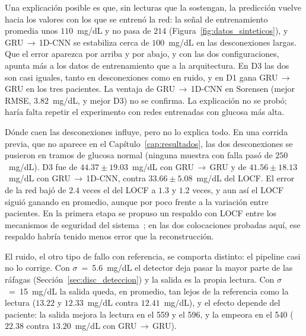 \documentclass{report}
\begin{document}
Una explicación posible es que, sin lecturas que la sostengan, la predicción vuelve hacia los valores con los que se entrenó la red: la señal de entrenamiento promedia unos $110$~mg/dL y no pasa de $214$ (Figura~\ref{fig:datos_sinteticos}), y GRU\,$\rightarrow$\,1D-CNN se estabiliza cerca de $100$~mg/dL en las desconexiones largas. Que el error aparezca por arriba y por abajo, y con las dos configuraciones, apunta más a los datos de entrenamiento que a la arquitectura. En D3 las dos son casi iguales, tanto en desconexiones como en ruido, y en D1 gana GRU\,$\rightarrow$\,GRU en los tres pacientes. La ventaja de GRU\,$\rightarrow$\,1D-CNN en Sorensen (mejor RMSE, $3.82$~mg/dL, y mejor D3) no se confirma. La explicación no se probó; haría falta repetir el experimento con redes entrenadas con glucosa más alta.

Dónde caen las desconexiones influye, pero no lo explica todo. En una corrida previa, que no aparece en el Capítulo~\ref{cap:resultados}, las dos desconexiones se pusieron en tramos de glucosa normal (ninguna muestra con falla pasó de $250$~mg/dL). D3 fue de $44.37 \pm 19.03$~mg/dL con GRU\,$\rightarrow$\,GRU y de $41.56 \pm 18.13$~mg/dL con GRU\,$\rightarrow$\,1D-CNN, contra $33.66 \pm 5.08$~mg/dL del LOCF. El error de la red bajó de $2.4$ veces el del LOCF a $1.3$ y $1.2$ veces, y aun así el LOCF siguió ganando en promedio, aunque por poco frente a la variación entre pacientes. En la primera etapa se propuso un respaldo con LOCF entre los mecanismos de seguridad del sistema~\cite{sanchez2025imputation}; en las dos colocaciones probadas aquí, ese respaldo habría tenido menos error que la reconstrucción.

El ruido, el otro tipo de fallo con referencia, se comporta distinto: el pipeline casi no lo corrige. Con $\sigma$~=~5.6~mg/dL el detector deja pasar la mayor parte de las ráfagas (Sección~\ref{sec:disc_deteccion}) y la salida es la propia lectura. Con $\sigma$~=~15~mg/dL la salida queda, en promedio, tan lejos de la referencia como la lectura ($13.22$ y $12.33$~mg/dL contra $12.41$~mg/dL), y el efecto depende del paciente: la salida mejora la lectura en el 559 y el 596, y la empeora en el 540 ($22.38$ contra $13.20$~mg/dL con GRU\,$\rightarrow$\,GRU).
\end{document}
